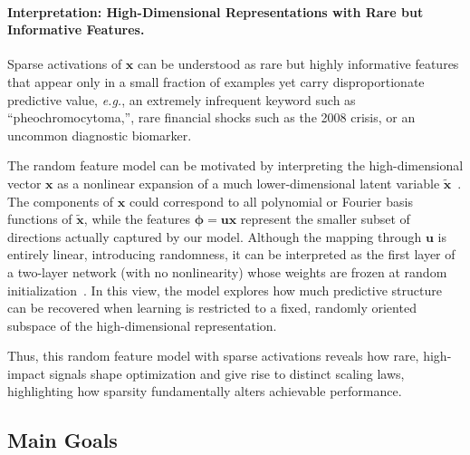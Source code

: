 \documentclass[11pt]{article}
\theoremstyle{plain}
\theoremstyle{definition}
\theoremstyle{remark}
\begin{document}
\vspace{-5mm}
\paragraph{Interpretation: High-Dimensional Representations with Rare but Informative Features.}  Sparse activations of \(\mathbf{x}\) can be understood as rare but highly informative features that appear only in a small fraction of examples yet carry disproportionate predictive value, \textit{e.g.}, an extremely infrequent keyword such as ``pheochromocytoma,'', rare financial shocks such as the 2008 crisis, or an uncommon diagnostic biomarker.



The random feature model can be motivated by interpreting the high-dimensional vector \(\mathbf{x}\) as a nonlinear expansion of a much lower-dimensional latent variable \(\tilde{\mathbf{x}}\)~\citep{rahimi2007randomfeatures}. The components of \(\mathbf{x}\) could correspond to all polynomial or Fourier basis functions of \(\tilde{\mathbf{x}}\), while the features \(\boldsymbol{\phi}=\mathbf{u}\mathbf{x}\) represent the smaller subset of directions actually captured by our model. Although the mapping through \(\mathbf{u}\) is entirely linear, introducing randomness, it can be interpreted as the first layer of a two-layer network (with no nonlinearity) whose weights are frozen at random initialization~\citep{cho2009kernel}. In this view, the model explores how much predictive structure can be recovered when learning is restricted to a fixed, randomly oriented subspace of the high-dimensional representation.


Thus, this random feature model with sparse activations reveals how rare, high-impact signals shape optimization and give rise to distinct scaling laws, highlighting how sparsity fundamentally alters achievable performance.





\subsection{Main Goals}
\end{document}
